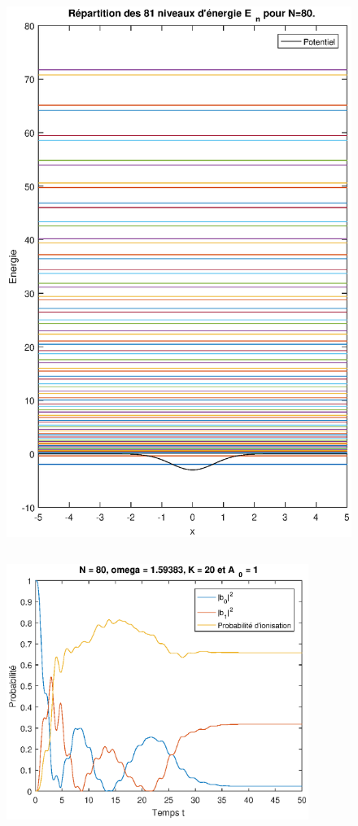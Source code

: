 \documentclass{report}
\begin{document}
\begin{figure}[p]
\begin{center}
  \includegraphics[height=18cm]{repartition_energie.eps}
  \end{center}
  \caption{}
  \label{fig_repartition_energie}
\end{figure}

\begin{figure}
	\begin{center}
  \includegraphics[height=8.3cm]{N80_K20_A1.eps}
    \end{center}
  \caption{}
  \label{fig_N80_K20_A1}
\end{figure}
\end{document}
